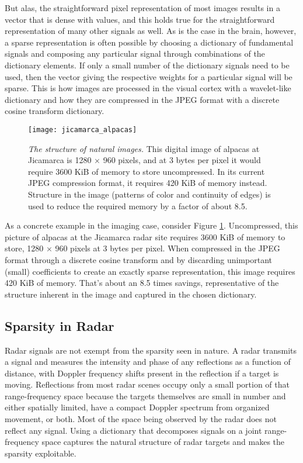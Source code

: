 But alas, the straightforward pixel representation of most images results in a vector that is dense with values, and this holds true for the straightforward representation of many other signals as well. As is the case in the brain, however, a sparse representation is often possible by choosing a dictionary of fundamental signals and composing any particular signal through combinations of the dictionary elements. If only a small number of the dictionary signals need to be used, then the vector giving the respective weights for a particular signal will be sparse. This is how images are processed in the visual cortex with a wavelet-like dictionary and how they are compressed in the JPEG format with a discrete cosine transform dictionary.

\begin{figure}[tbp]
 \centering
 \texttt{[image: jicamarca\_alpacas]}
 \caption[The structure of natural images]{\emph{The structure of natural images.} This digital image of alpacas at Jicamarca is 1280 $\times$ 960 pixels, and at 3 bytes per pixel it would require 3600 KiB of memory to store uncompressed. In its current JPEG compression format, it requires 420 KiB of memory instead. Structure in the image (patterns of color and continuity of edges) is used to reduce the required memory by a factor of about 8.5.}
 \label{fig:jicamarca_alpacas}
\end{figure}%
As a concrete example in the imaging case, consider Figure \ref{fig:jicamarca_alpacas}. Uncompressed, this picture of alpacas at the Jicamarca radar site requires 3600 KiB of memory to store, 1280 $\times$ 960 pixels at 3 bytes per pixel. When compressed in the JPEG format through a discrete cosine transform and by discarding unimportant (small) coefficients to create an exactly sparse representation, this image requires 420 KiB of memory. That's about an 8.5 times savings, representative of the structure inherent in the image and captured in the chosen dictionary.

\subsection{Sparsity in Radar}
\label{intro_radar_sparsity}
Radar signals are not exempt from the sparsity seen in nature. A radar transmits a signal and measures the intensity and phase of any reflections as a function of distance, with Doppler frequency shifts present in the reflection if a target is moving. Reflections from most radar scenes occupy only a small portion of that range-frequency space because the targets themselves are small in number and either spatially limited, have a compact Doppler spectrum from organized movement, or both. Most of the space being observed by the radar does not reflect any signal. Using a dictionary that decomposes signals on a joint range-frequency space captures the natural structure of radar targets and makes the sparsity exploitable.

